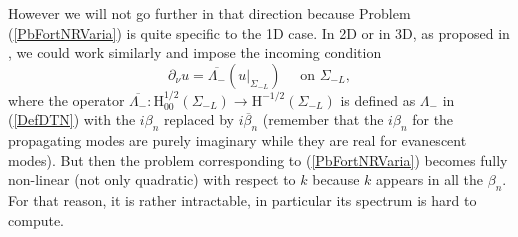 \documentclass[11pt,a4paper]{report}
\newcommand{\mrm}[1]{\mathrm{#1}}
\newcommand{\mH}{\mrm{H}}
\begin{document}
\newline
However we will not go further in that direction because Problem (\ref{PbFortNRVaria}) is quite specific to the 1D case. In 2D or in 3D, as proposed in \cite{Stone-et-al-2020}, we could work similarly and impose the incoming condition 
\[
\partial_\nu u=\overline{\Lambda_-}(u|_{\Sigma_{-L}})\quad\mbox{ on }\Sigma_{-L},
\]
where the operator $\overline{\Lambda_-}:\mH^{1/2}_{00}(\Sigma_{-L}) \to \mH^{-1/2}(\Sigma_{-L})$ is defined as $\Lambda_-$ in (\ref{DefDTN}) with the $i\beta_n$ replaced by $\overline{i\beta_n}$ (remember that the $i\beta_n$ for the propagating modes are purely imaginary while they are real for evanescent modes). But then the problem 
corresponding to (\ref{PbFortNRVaria}) becomes fully non-linear (not only quadratic) with respect to $k$ because $k$ appears in all the $\beta_n$. For that reason, it is rather intractable, in particular its spectrum is hard to compute.
\end{document}
